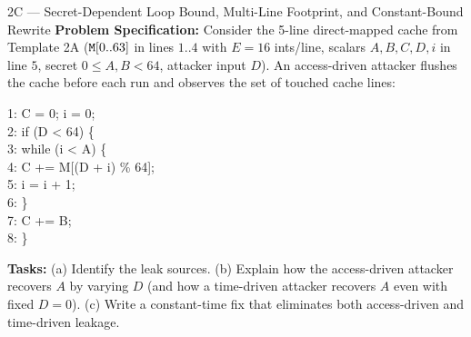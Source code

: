 \begin{templatebox}{2C --- Secret-Dependent Loop Bound, Multi-Line Footprint, and Constant-Bound Rewrite}
\textbf{Problem Specification:} Consider the 5-line direct-mapped cache from Template 2A ($\texttt{M}[0..63]$ in lines $1..4$ with $E = 16$ ints/line, scalars $A, B, C, D, i$ in line $5$, secret $0 \le A, B < 64$, attacker input $D$). An access-driven attacker flushes the cache before each run and observes the set of touched cache lines:
\begin{codeblock}
1: C = 0; \; i = 0;\\
2: if (D < 64) \{\\
3: \hspace*{1.5em} while (i < A) \{\\
4: \hspace*{3.0em} C += M[(D + i) \% 64];\\
5: \hspace*{3.0em} i = i + 1;\\
6: \hspace*{1.5em} \}\\
7: \hspace*{1.5em} C += B;\\
8: \}
\end{codeblock}
\textbf{Tasks:} (a) Identify the leak sources. (b) Explain how the access-driven attacker recovers $A$ by varying $D$ (and how a time-driven attacker recovers $A$ even with fixed $D=0$). (c) Write a constant-time fix that eliminates both access-driven and time-driven leakage.


\end{templatebox}
